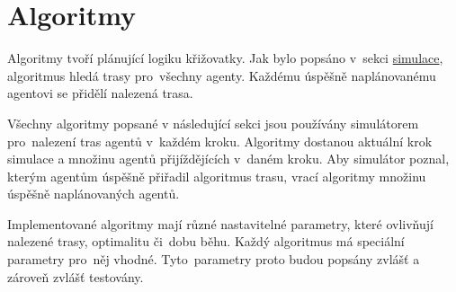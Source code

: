 \chapter{Algoritmy}\label{ch:algoritmy}

%

Algoritmy tvoří plánující logiku křižovatky.
Jak bylo popsáno v~sekci \hyperref[sec:simulace]{simulace}, algoritmus hledá trasy pro~všechny agenty.
Každému úspěšně naplánovanému agentovi se přidělí nalezená trasa.

Všechny algoritmy popsané v následující sekci jsou používány simulátorem pro~nalezení tras agentů v~každém kroku.
Algoritmy dostanou aktuální krok simulace a množinu agentů přijíždějících v~daném kroku.
Aby simulátor poznal, kterým agentům úspěšně přiřadil algoritmus trasu,
vrací algoritmy množinu úspěšně naplánovaných agentů.

Implementované algoritmy mají různé nastavitelné parametry, které ovlivňují nalezené trasy, optimalitu či~dobu běhu.
Každý algoritmus má speciální parametry pro~něj vhodné.
Tyto~parametry proto budou popsány zvlášť a zároveň zvlášť testovány.








